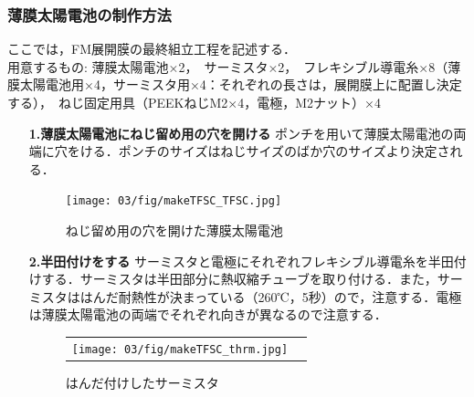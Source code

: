 \subsubsection*{薄膜太陽電池の制作方法}
ここでは，FM展開膜の最終組立工程を記述する．\\
用意するもの:
薄膜太陽電池×2，　サーミスタ×2，　フレキシブル導電糸×8（薄膜太陽電池用×4，サーミスタ用×4：それぞれの長さは，展開膜上に配置し決定する），　ねじ固定用具（PEEKねじM2×4，電極，M2ナット）×4
\begin{itemize}
	\item[\textbf{1.薄膜太陽電池にねじ留め用の穴を開ける}]
	ポンチを用いて薄膜太陽電池の両端に穴をける．ポンチのサイズはねじサイズのばか穴のサイズより決定される．
	\begin{figure}[H]
		\centering
		\texttt{[image: 03/fig/makeTFSC\_TFSC.jpg]}
		\caption{ねじ留め用の穴を開けた薄膜太陽電池}
		\label{fig3-9-3-3}
	\end{figure}
	\item[\textbf{2.半田付けをする}]
	サーミスタと電極にそれぞれフレキシブル導電糸を半田付けする．サーミスタは半田部分に熱収縮チューブを取り付ける．また，サーミスタははんだ耐熱性が決まっている（260℃，5秒）ので，注意する．電極は薄膜太陽電池の両端でそれぞれ向きが異なるので注意する．
	\begin{figure}[H]
		\begin{tabular}{cc}
			\begin{minipage}[t]{0.45\hsize}
				\centering
				\texttt{[image: 03/fig/makeTFSC\_thrm.jpg]}
				\caption{はんだ付けしたサーミスタ}
				\label{fig3-9-3-4}
			\end{minipage} &
		

\end{tabular}
\end{figure}
\end{itemize}
